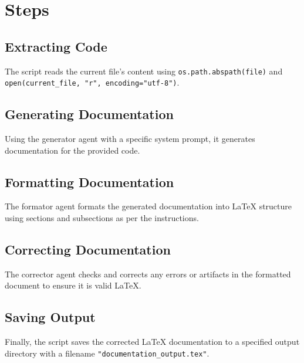 \documentclass{article}
\begin{document}
\section{Steps}
\subsection{Extracting Code}
The script reads the current file's content using \texttt{os.path.abspath(file)} and \texttt{open(current\_file, "r", encoding="utf-8")}.

\subsection{Generating Documentation}
Using the generator agent with a specific system prompt, it generates documentation for the provided code.

\subsection{Formatting Documentation}
The formator agent formats the generated documentation into LaTeX structure using sections and subsections as per the instructions.

\subsection{Correcting Documentation}
The corrector agent checks and corrects any errors or artifacts in the formatted document to ensure it is valid LaTeX.

\subsection{Saving Output}
Finally, the script saves the corrected LaTeX documentation to a specified output directory with a filename \texttt{"documentation\_output.tex"}.
\end{document}
